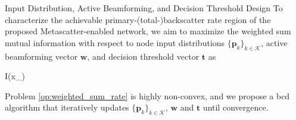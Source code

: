 \documentclass[journal]{IEEEtran}
\begin{document}
\begin{section}{Input Distribution, Active Beamforming, and Decision Threshold Design}
	To characterize the achievable primary-(total-)backscatter rate region of the proposed Metascatter-enabled network, we aim to maximize the weighted sum mutual information with respect to node input distributions $\{\boldsymbol{p}_k\}_{k \in \mathcal{K}}$, active beamforming vector $\boldsymbol{w}$, and decision threshold vector $\boldsymbol{t}$ as
	\begin{maxi!}
		{}{I(x_{})}{\label{op:weighted_sum_rate}}{\label{ob:weighted_sum_rate}}
	\end{maxi!}
	Problem \eqref{op:weighted_sum_rate} is highly non-convex, and we propose a \gls{bcd} algorithm that iteratively updates $\{\boldsymbol{p}_k\}_{k \in \mathcal{K}}$, $\boldsymbol{w}$ and $\boldsymbol{t}$ until convergence.


\end{section}
\end{document}
